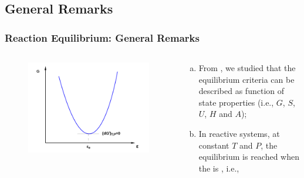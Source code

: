 \documentclass[10pt,compress,unknownkeysallowed]{beamer}
\begin{document}
\subsection{General Remarks}

\begin{frame}
  \frametitle{Reaction Equilibrium: General Remarks}
  \begin{columns}
     \begin{column}[l]{0.5\linewidth}\scriptsize
      \begin{figure}%
        \begin{center}
          \includegraphics[width=1.05\columnwidth,clip]{./../Pics/ChemicalReactions_GxPlot}
        \end{center}
      \end{figure}
     \end{column}
     \begin{column}[l]{0.5\linewidth}%
        \begin{enumerate}[a)] 
           \item<1-> From , we studied that the equilibrium criteria can be described as function of state properties (i.e., $G$, $S$, $U$, $H$ and $A$);
           \item<2-> In reactive systems, at constant $T$ and $P$, the equilibrium is reached when the  is , i.e., 
        \end{enumerate}
     \end{column}
  \end{columns}
\end{frame}
\normalsize
\end{document}
